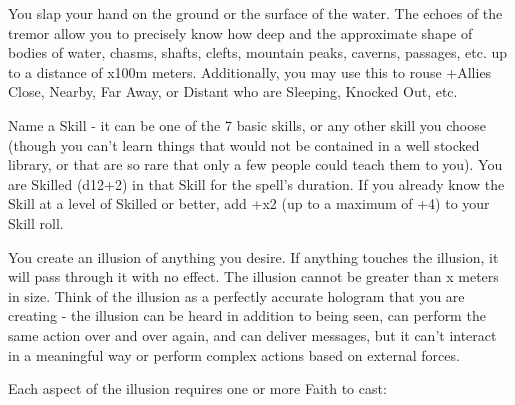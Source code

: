 {\MYSTERY [
  Name = Sound the Deeps,
  Link = arcana-mystery-sound-the-deeps,
  Paradigm = Force,
  Save = N,
  Duration = Instant,
  Target = Close Target(s)
]

You slap your hand on the ground or the surface of the water.  The echoes of the tremor allow you to precisely know how deep and the approximate shape of bodies of water, chasms, shafts, clefts, mountain peaks, caverns, passages, etc.  up to a distance of \DICE x100m meters.  Additionally, you may use this to rouse \DICE+\DICE Allies Close, Nearby, Far Away, or Distant who are Sleeping, Knocked Out, etc. 

\newpage

\MYSTERY [
  Name = Expertise,
  Link = arcana-mystery-expertise,
  Paradigm = Mind,
  Save = N,
  Duration = \SUM Minutes,
  Target = Self
]

Name a Skill - it can be one of the 7 basic skills, or any other skill you choose (though you can't learn things that would not be contained in a well stocked library, or that are so rare that only a few people could teach them to you).  You are Skilled (d12+2) in that Skill for the spell's duration.  If you already know the Skill at a level of Skilled or better, add +\DICE x2 (up to a maximum of +4) to your Skill roll.

\MYSTERY [
  Name = Illusion,
  Link = arcana-mystery-illusion,
  Paradigm = Mind,
  Save = N,
  Duration = Varies,
  Target = See Below
]

You create an illusion of anything you desire. If anything touches the illusion, it will pass through it with no effect.  The illusion cannot be greater than \DICE x \DICE meters in size.  Think of the illusion as a perfectly accurate hologram that you are creating - the illusion can be heard in addition to being seen, can perform the same action over and over again, and can deliver messages, but it can't interact in a meaningful way or perform complex actions based on external forces. 

Each aspect of the illusion requires one or more Faith to cast:


}
